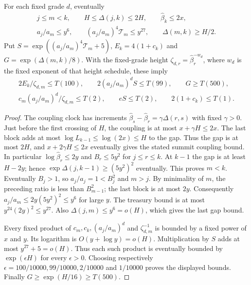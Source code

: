 \begin{lemma}
\label{lem:ex-trace-pair-moving-bills}
For each fixed grade $d$, eventually
\begin{gather*}
 j\le m<k,\qquad H\le\Delta(j,k)\le2H,
 \qquad \widehat\beta_k\le2x,\\
 a_j/a_m\le y^6,\qquad
 (a_j/a_m)^4\mathcal T_m\le y^{27},\qquad
 \Delta(m,k)\ge H/2.
\end{gather*}
Put $S=\exp((a_j/a_m)^4\mathcal T_m+5)$,
$E_k=4(1+c_k)$ and $G=\exp(\Delta(m,k)/8)$.
With the fixed-grade height $\zeta_{d,r}=\widehat\beta_r^{-w_d}$,
where $w_d$ is the fixed exponent of that height schedule, these imply
\begin{gather}
 2E_k/\zeta_{d,m}\le T(100),\qquad
 2(a_j/a_m)^d S\le T(99),\qquad G\ge T(500),
 \label{eq:ex-trace-pair-localizer-bills}\\
 c_m(a_j/a_m)^d/\zeta_{d,m}\le T(2),\qquad
 eS\le T(2),\qquad 2(1+c_k)\le T(1).
 \label{eq:ex-trace-pair-root-bills}
\end{gather}
\end{lemma}
\begin{proof}
The coupling clock has increments
$\widehat\beta_s-\widehat\beta_r=\gamma\Delta(r,s)$ with fixed
$\gamma>0$. Just before the first crossing of $H$, the coupling is
at most $x+\gamma H\le2x$. The last block adds at most
$\log L_{k-1}\le\log(2x)\le H$ to the gap. Thus the gap is at
most $2H$, and $x+2\gamma H\le2x$ eventually gives the stated
summit coupling bound. In particular
$\log\widehat\beta_r\le2y$ and $B_r\le5y^2$ for $j\le r\le k$.
At $k-1$ the gap is at least $H-2y$; hence
$\exp\Delta(j,k-1)\ge(5y^2)^2$ eventually. This proves $m<k$.
Eventually $B_j>1$, so $a_j/a_j=1<B_j^2$ and $m>j$.
By minimality of $m$, the preceding ratio is less than $B_{m-1}^2$;
the last block is at most $2y$. Consequently
$a_j/a_m\le2y(5y^2)^2\le y^6$ for large $y$.
The treasury bound is at most $y^{24}(2y)^2\le y^{27}$.
Also $\Delta(j,m)\le y^6=o(H)$, which gives the last gap bound.

Every fixed product of $c_m,c_k,(a_j/a_m)^d$ and
$\zeta_{d,m}^{-1}$ is bounded by a fixed power of $x$ and $y$.
Its logarithm is $O(y+\log y)=o(H)$. Multiplication by $S$ adds
at most $y^{27}+5=o(H)$. Thus each such product is eventually
bounded by $\exp(\epsilon H)$ for every $\epsilon>0$.
Choosing respectively $\epsilon=100/10000,99/10000,2/10000$
and $1/10000$ proves the displayed bounds. Finally
$G\ge\exp(H/16)\ge T(500)$.
\end{proof}

